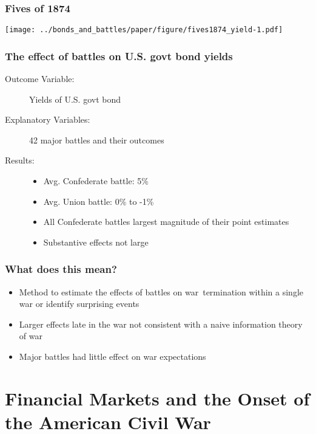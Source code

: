 \documentclass[]{beamer}\usepackage[]{graphicx}\usepackage[]{color}
\begin{document}
\begin{frame}
  \frametitle{Fives of 1874}

  \texttt{[image: ../bonds\_and\_battles/paper/figure/fives1874\_yield-1.pdf]}

\end{frame}


\begin{frame}
  \frametitle{The effect of battles on U.S. govt bond yields}

  \begin{description}
  \item[Outcome Variable:] Yields of U.S. govt bond
  \item[Explanatory Variables:] 42 major battles and their outcomes
  \item[Results:] \quad
    \begin{itemize}
    \item Avg. Confederate battle: 5\%  
    \item Avg. Union battle: 0\% to -1\%
    \item All Confederate battles largest magnitude of their point estimates
    \item Substantive effects not large
    \end{itemize}
  \end{description}


\end{frame}

\begin{frame}
  \frametitle{What does this mean?}

  \begin{itemize}
  \item Method to estimate the effects of battles on war~termination within a single war or identify surprising events
  \item Larger effects late in the war not consistent with a naive information theory of war
  \item Major battles had little effect on war expectations
  \end{itemize}
    
\end{frame}


\section{Financial Markets and the Onset of the American Civil War}
\end{document}
